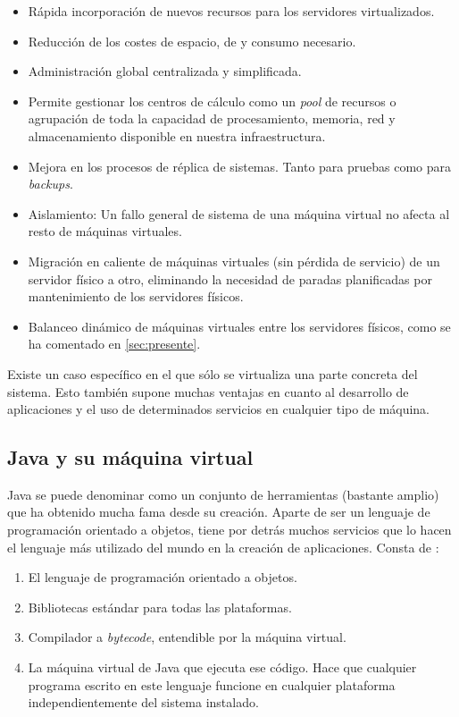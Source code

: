 \begin{itemize}
	\item Rápida incorporación de nuevos recursos para los servidores virtualizados.
	\item Reducción de los costes de espacio, de \hardware y consumo necesario.
	\item Administración global centralizada y simplificada.
	\item Permite gestionar los centros de cálculo como un \emph{pool} 
	de recursos o agrupación de toda la capacidad de procesamiento, 
	memoria, red y almacenamiento disponible en nuestra 
	infraestructura.
	\item Mejora en los procesos de réplica de sistemas. Tanto para 
	pruebas como para \emph{backups}.
	\item Aislamiento: Un fallo general de sistema de una máquina 
	virtual no afecta al resto de máquinas virtuales.
	\item Migración en caliente de máquinas virtuales (sin pérdida de 
	servicio) de un servidor físico a otro, eliminando la necesidad de 
	paradas planificadas por mantenimiento de los servidores físicos.
	\item Balanceo dinámico de máquinas virtuales entre los servidores 
	físicos, como se ha comentado en \ref{sec:presente}.
\end{itemize}

Existe un caso específico en el que sólo se virtualiza una parte 
concreta del sistema. Esto también supone muchas ventajas en cuanto al 
desarrollo de aplicaciones y el uso de determinados servicios en 
cualquier tipo de máquina.

\subsection{Java y su máquina virtual}
\label{subsec:Java}
Java  se puede denominar como un conjunto de herramientas (bastante 
amplio) que ha obtenido mucha fama desde su creación. Aparte de ser 
un lenguaje de programación orientado a objetos, tiene por detrás 
muchos servicios que lo hacen el lenguaje más utilizado del mundo en 
la creación de aplicaciones. Consta de \cite{java2}:

\begin{enumerate}
	\item El lenguaje de programación orientado a objetos.
	\item Bibliotecas estándar para todas las plataformas.
	\item Compilador a \emph{bytecode}, entendible por la máquina 
	virtual.
	\item La máquina virtual de Java que ejecuta ese código. Hace que 
	cualquier programa escrito en este lenguaje funcione en cualquier 
	plataforma independientemente del sistema instalado.
\end{enumerate}

